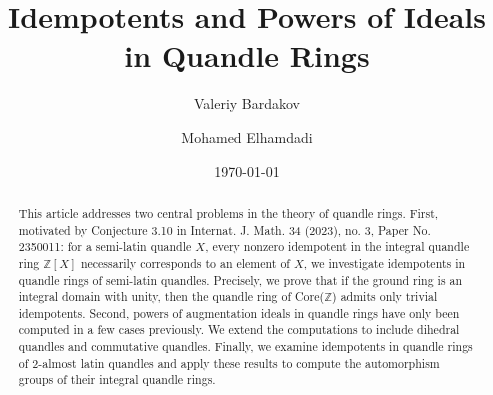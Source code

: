 \documentclass[12pt]{amsart}
\date{}
\date{\today}
\title{ Idempotents and Powers of Ideals in Quandle Rings}
\author{Valeriy Bardakov}
\author{Mohamed Elhamdadi}
\theoremstyle{definition}
\theoremstyle{remark}
\begin{document}
\maketitle 


\begin{abstract}

This article addresses two central problems in the theory of quandle rings. 
First, motivated by Conjecture 3.10 in Internat. J. Math. 34 (2023), no. 3, Paper No. 2350011: for a semi-latin quandle \(X\), every nonzero idempotent in the integral quandle ring \(\mathbb{Z}[X]\) necessarily corresponds to an element of \(X\), we investigate idempotents in quandle rings of semi-latin quandles.  Precisely, we prove that if the ground ring is an integral domain with unity, then the quandle ring of Core($\mathbb{Z}$) admits only trivial idempotents.  Second, powers of augmentation ideals in quandle rings have only been computed in a few cases previously.  We extend the computations to include dihedral quandles and commutative quandles.  Finally, we examine idempotents in quandle rings of \(2\)-almost latin quandles and apply these results to compute the automorphism groups of their integral quandle rings.

\end{abstract}

\tableofcontents
\end{document}
